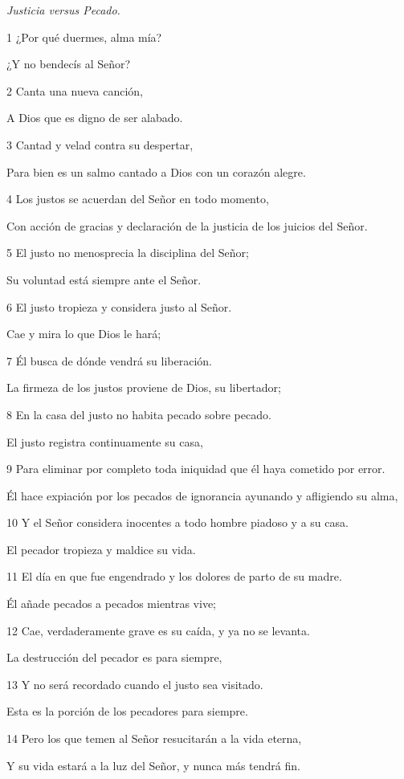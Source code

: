 \par \textit{Justicia versus Pecado.}

\par 1 ¿Por qué duermes, alma mía?
\par     ¿Y no bendecís al Señor?
\par 2 Canta una nueva canción,
\par     A Dios que es digno de ser alabado.
\par 3 Cantad y velad contra su despertar,
\par     Para bien es un salmo cantado a Dios con un corazón alegre.
\par   
\par 4 Los justos se acuerdan del Señor en todo momento,
\par     Con acción de gracias y declaración de la justicia de los juicios del Señor.
\par 5 El justo no menosprecia la disciplina del Señor;
\par     Su voluntad está siempre ante el Señor.
\par 6 El justo tropieza y considera justo al Señor.
\par     Cae y mira lo que Dios le hará;
\par 7 Él busca de dónde vendrá su liberación.
\par     La firmeza de los justos proviene de Dios, su libertador;
\par 8 En la casa del justo no habita pecado sobre pecado.
\par     El justo registra continuamente su casa,
\par 9 Para eliminar por completo toda iniquidad que él haya cometido por error.
\par     Él hace expiación por los pecados de ignorancia ayunando y afligiendo su alma,
\par 10 Y el Señor considera inocentes a todo hombre piadoso y a su casa.
\par     El pecador tropieza y maldice su vida.
\par 11 El día en que fue engendrado y los dolores de parto de su madre.
\par     Él añade pecados a pecados mientras vive;
\par 12 Cae, verdaderamente grave es su caída, y ya no se levanta.
\par     La destrucción del pecador es para siempre,
\par 13 Y no será recordado cuando el justo sea visitado.
\par     Esta es la porción de los pecadores para siempre.
\par   
\par 14 Pero los que temen al Señor resucitarán a la vida eterna,
\par     Y su vida estará a la luz del Señor, y nunca más tendrá fin.

